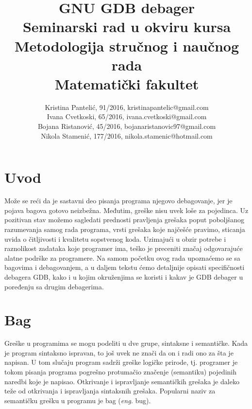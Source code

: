 \documentclass[a4paper]{article}
\begin{document}
\title{GNU GDB debager\\ \small{Seminarski rad u okviru kursa\\Metodologija stručnog i naučnog rada\\ Matematički fakultet}}

\author{Kristina Pantelić, 91/2016, kristinapantelic@gmail.com 
\\
Ivana Cvetkoski, 65/2016, ivana.cvetkoski@gmail.com
\\
Bojana Ristanović, 45/2016, bojanaristanovic97@gmail.com
\\
Nikola Stamenić, 177/2016, nikola.stamenic@hotmail.com
}

\maketitle


\tableofcontents

\newpage

\section{Uvod}
\label{sec:uvod}

Može se reći da je sastavni deo pisanja programa njegovo
debagovanje, jer je pojava bagova gotovo neizbežna. Međutim, greške nisu uvek
loše za pojedinca. Uz pozitivan stav možemo sagledati prednosti pravljenja grešaka
poput poboljšanog razumevanja samog rada programa,
vrsti grešaka koje najčešće pravimo, sticanja uvida o čitljivosti i
kvalitetu sopstvenog koda. Uzimajući u obzir potrebe i raznolikost
zadataka koje programer ima, teško je preceniti značaj odgovarajuće
alatne podrške za programere\cite{seminarski_rad}. 
Na samom početku ovog rada
upoznaćemo se sa bagovima i debagovanjem, a u daljem tekstu ćemo
detaljnije opisati specifičnosti debagera GDB, kako i u kojim
okruženjima se koristi i kakav je GDB debager u poređenju sa drugim debagerima. 

\section{Bag}
\label{sec:bag}
Greške u programima se mogu podeliti u dve grupe, sintaksne i semantičke. Kada je program sintaksno ispravan, to još uvek
 ne znači da on i radi ono za šta je napisan. U tom slučaju program sadrži greške logičke prirode, tj. programer je tokom 
 pisanja programa  pogrešno protumačio značenje (semantiku) pojedinih naredbi koje je napisao. Otkrivanje i ispravljanje 
 semantičkih grešaka je daleko teže od otkrivanja i ispravljanja sintaksnih grešaka. Popularni naziv za semantičku grešku 
 u programu je bag (\textit{eng.} bug).
\end{document}
